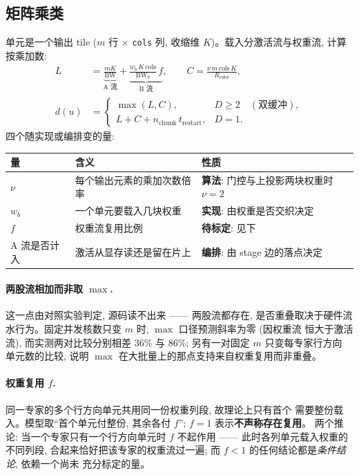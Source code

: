 \documentclass[11pt,a4paper]{article}
\newcommand{\BW}{\mathrm{BW}}
\newcommand{\code}[1]{\texttt{#1}}
\begin{document}
\subsection{矩阵乘类}
\label{sec:f-gmm}

单元是一个输出 tile ($m$ 行 $\times$ \code{cols} 列, 收缩维 $K$)。载入分激活流与权重流,
计算按乘加数:
\begin{align}
L &= \underbrace{\frac{m K}{\BW}}_{\text{A 流}}
   + \underbrace{\frac{w_b\, K\, \text{cols}}{\BW_b}\, f}_{\text{B 流}},
\qquad
C = \frac{\nu\, m\, \text{cols}\, K}{R_{\text{cube}}},
\label{eq:gmm-phase}\\
d(u) &= \begin{cases}
  \max(L, C), & D \ge 2 \quad (\text{双缓冲}),\\
  L + C + n_{\text{chunk}}\, t_{\text{restart}}, & D = 1 .
\end{cases}
\label{eq:gmm}
\end{align}
四个随实现或编排变的量:

\begin{center}
\begin{tabular}{@{}lll@{}}
\toprule
量 & 含义 & 性质 \\
\midrule
$\nu$ & 每个输出元素的乘加次数倍率 & \textbf{算法}: 门控与上投影两块权重时 $\nu=2$ \\
$w_b$ & 一个单元要载入几块权重 & \textbf{实现}: 由权重是否交织决定 \\
$f$ & 权重流复用比例 & \textbf{待标定}: 见下 \\
A 流是否计入 & 激活从显存读还是留在片上 & \textbf{编排}: 由 stage 边的落点决定 \\
\bottomrule
\end{tabular}
\end{center}

\paragraph{两股流相加而非取 $\max$.} 这一点由对照实验判定, 源码读不出来 —— 两股流都存在,
是否重叠取决于硬件流水行为。固定并发核数只变 $m$ 时, $\max$ 口径预测斜率为零 (因权重流
恒大于激活流), 而实测两对比较分别相差 36\% 与 86\%; 另有一对固定 $m$ 只变每专家行方向
单元数的比较, 说明 $\max$ 在大批量上的那点支持来自权重复用而非重叠。

\paragraph{权重复用 $f$.} 同一专家的多个行方向单元共用同一份权重列段, 故理论上只有首个
需要整份载入。模型取``首个单元付整份, 其余各付 $f$''; $f=1$ 表示\textbf{不声称存在复用}。
两个推论: 当一个专家只有一个行方向单元时 $f$ 不起作用 —— 此时各列单元载入权重的不同列段,
合起来恰好把该专家的权重流过一遍; 而 $f<1$ 的任何结论都是\emph{条件结论}, 依赖一个尚未
充分标定的量。
\end{document}
